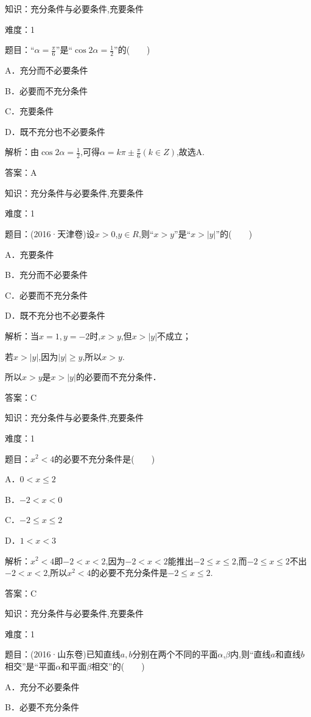 \documentclass{article} %
\begin{document}
知识：充分条件与必要条件,充要条件

难度：1

题目：``$\alpha=\frac{\pi}{6}$''是``$\cos 2\alpha=\frac{1}{2}$''的(　　)

A．充分而不必要条件

B．必要而不充分条件

C．充要条件

D．既不充分也不必要条件

解析：由$\cos 2\alpha=\frac{1}{2}$,可得$\alpha=k\pi \pm\frac{\pi}{6}(k\in Z)$,故选A.

答案：A



知识：充分条件与必要条件,充要条件

难度：1

题目：(2016·天津卷)设$x>0$,$y\in R$,则``$x>y$''是``$x>|y|$''的(　　)

A．充要条件

B．充分而不必要条件

C．必要而不充分条件

D．既不充分也不必要条件

解析：当$x=1,y=-2$时,$x>y$,但$x>|y|$不成立；

若$x>|y|$,因为$|y|\ge y$,所以$x{>}y$.

所以$x{>}y$是$x>|y|$的必要而不充分条件．

答案：C



知识：充分条件与必要条件,充要条件

难度：1

题目：$x^{2}<4$的必要不充分条件是(　　)

A．$0<x\le 2$   

B．$-2<x<0$

C．$-2\le x\le 2$   

D．$1<x<3$

解析：$x^{2}<4$即$-2<x<2$,因为$-2<x<2$能推出$-2\le x\le 2$,而$-2\le x\le2$不出$-2<x<2$,所以$x^{2}<4$的必要不充分条件是$-2\le x\le 2$.

答案：C



知识：充分条件与必要条件,充要条件

难度：1

题目：(2016·山东卷)已知直线$a,b$分别在两个不同的平面$\alpha$,$\beta$内,则``直线$a$和直线$b$相交''是``平面$\alpha$和平面$\beta$相交''的(　　)

A．充分不必要条件

B．必要不充分条件
\end{document}
